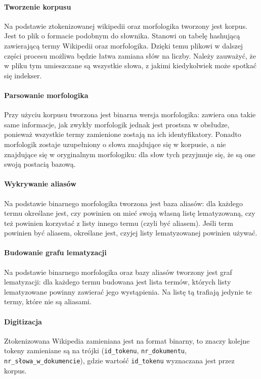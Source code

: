 \documentclass[a4paper,12pt]{article}
\begin{document}
\paragraph{Tworzenie korpusu} Na podstawie ztokenizowanej wikipedii oraz
morfologika tworzony jest korpus. Jest to plik o formacie podobnym do
słownika. Stanowi on tabelę hashującą zawierającą termy Wikipedii oraz
morfologika. Dzięki temu plikowi w dalszej części procesu możliwa będzie
łatwa zamiana słów na liczby. Należy zauważyć, że w pliku tym umieszczane są
wszystkie słowa, z jakimi kiedykolwiek może spotkać się indekser.

\paragraph{Parsowanie morfologika} Przy użyciu korpusu tworzona jest binarna
wersja morfologika: zawiera ona takie same informacje, jak zwykły morfologik
jednak jest prostsza w obsłudze, ponieważ wszystkie termy zamienione zostają
na ich identyfikatory. Ponadto morfologik zostaje uzupełniony o słowa
znajdujące się w korpusie, a nie znajdujące się w oryginalnym morfologiku:
dla słow tych przyjmuje się, że są one swoją postacią bazową.

\paragraph{Wykrywanie aliasów} Na podstawie binarnego morfologika tworzona
jest baza aliasów: dla każdego termu określane jest, czy powinien on mieć
swoją własną listę lematyzowaną, czy też powinien korzystać z listy innego
termu (czyli być aliasem). Jeśli term powinien być aliasem, określane jest,
czyjej listy lematyzowanej powinien używać.

\paragraph{Budowanie grafu lematyzacji} Na podstawie binarnego morfologika
oraz bazy aliasów tworzony jest graf lematyzacji: dla każdego termu budowana
jest lista termów, których listy lematyzowane powinny zawierać jego
wystąpienia. Na listę tą trafiają jedynie te termy, które nie są aliasami.

\paragraph{Digitizacja} Ztokenizowana Wikipedia zamieniana jest na format
binarny, to znaczy kolejne tokeny zamieniane są na trójki (\texttt{id\_tokenu},
\texttt{nr\_dokumentu}, \texttt{nr\_słowa\_w\_dokumencie}), gdzie wartość
\texttt{id\_tokenu} wyznaczana jest przez korpus.
\end{document}
